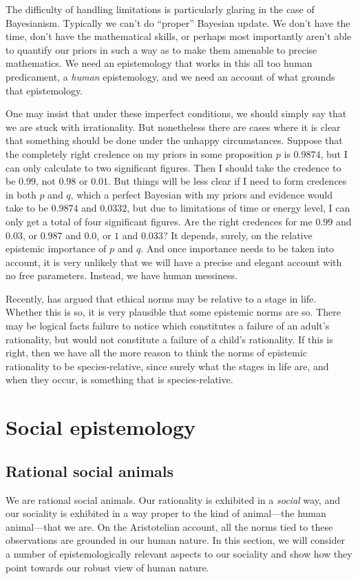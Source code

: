 The difficulty of handling limitations is particularly glaring in the case of Bayesianism. Typically 
we can't do ``proper'' Bayesian update. We don't have the time, don't have the mathematical skills, or perhaps most importantly aren't 
able to quantify our priors in such a way as to make them amenable to precise mathematics. We need an epistemology that 
works in this all too human predicament, a \textit{human} epistemology, and we need an account of what grounds that 
epistemology. 

One may insist that under these imperfect conditions, we should simply say that we are stuck with irrationality.
But nonetheless there are cases where it is clear that something should be done under the unhappy circumstances.
Suppose that the completely right credence on my priors in some proposition $p$ is $0.9874$, 
but I can only calculate to two significant figures. Then I should take the credence to be $0.99$, not $0.98$ or 
$0.01$. But things will be less clear if I need to form credences in both $p$ and $q$, which a perfect Bayesian
with my priors and evidence would take to be $0.9874$ and $0.0332$, but due to limitations of
time or energy level, I can only get a total of four significant figures. Are the right credences for me $0.99$
and $0.03$, or $0.987$ and $0.0$, or $1$ and $0.033$? It depends, surely, on the relative epistemic importance of $p$ and
$q$. And once importance needs to be taken into account, it is very unlikely that we will have a precise and elegant
account with no free parameters. Instead, we have human messiness.

Recently,  has argued that ethical norms may be relative to a stage in life. Whether this is so, it is very
plausible that some epistemic norms are so. There may be logical facts failure to notice which constitutes a failure of 
an adult's rationality, but would not constitute a failure of a child's rationality. If this is right, then we have all
the more reason to think the norms of epistemic rationality to be species-relative, since surely what the stages in 
life are, and when they occur, is something that is species-relative.

\section{Social epistemology}
\subsection{Rational social animals}
We are rational social animals. Our rationality is exhibited in a \textit{social} way, and our sociality is
exhibited in a way proper to the kind of animal---the human animal---that we are. On the Aristotelian account,
all the norms tied to these observations are grounded in our human nature. In this section, we will consider a
number of epistemologically relevant aspects to our sociality and show how they point towards our robust view
of human nature.

